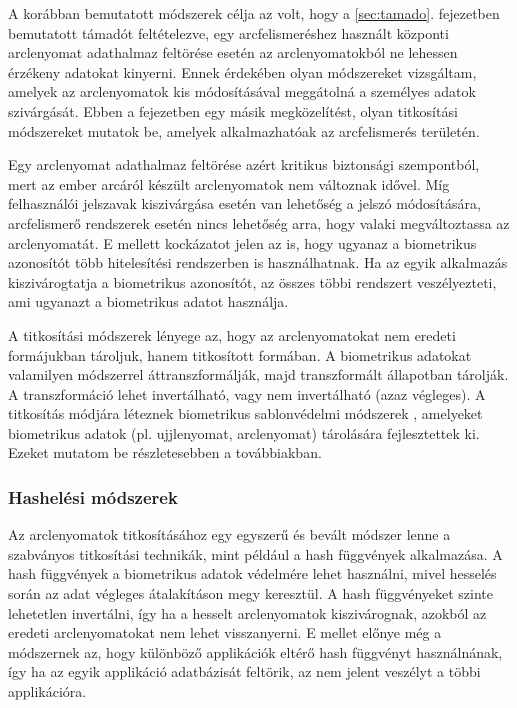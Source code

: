 A korábban bemutatott módszerek célja az volt, hogy a \ref{sec:tamado}. fejezetben bemutatott támadót feltételezve, egy arcfelismeréshez használt központi arclenyomat adathalmaz feltörése esetén az arclenyomatokból ne lehessen érzékeny adatokat kinyerni. Ennek érdekében olyan módszereket vizsgáltam, amelyek az arclenyomatok kis módosításával meggátolná a személyes adatok szivárgását. Ebben a fejezetben egy másik megközelítést, olyan titkosítási módszereket mutatok be, amelyek alkalmazhatóak az arcfelismerés területén.

Egy arclenyomat adathalmaz feltörése azért kritikus biztonsági szempontból, mert az ember arcáról készült arclenyomatok nem változnak idővel. Míg felhasználói jelszavak kiszivárgása esetén van lehetőség a jelszó módosítására, arcfelismerő rendszerek esetén nincs lehetőség arra, hogy valaki megváltoztassa az arclenyomatát. E mellett kockázatot jelen az is, hogy ugyanaz a biometrikus azonosítót több hitelesítési rendszerben is használhatnak. Ha az egyik alkalmazás kiszivárogtatja a biometrikus azonosítót, az összes többi rendszert veszélyezteti, ami ugyanazt a biometrikus adatot használja.

A titkosítási módszerek lényege az, hogy az arclenyomatokat nem eredeti formájukban tároljuk, hanem titkosított formában. A biometrikus adatokat valamilyen módszerrel áttranszformálják, majd transzformált állapotban tárolják. A transzformáció lehet invertálható, vagy nem invertálható (azaz végleges). A titkosítás módjára léteznek biometrikus sablonvédelmi módszerek \cite{patel2015cancelable}, amelyeket biometrikus adatok (pl. ujjlenyomat, arclenyomat) tárolására fejlesztettek ki. Ezeket mutatom be részletesebben a továbbiakban.



\subsubsection{Hashelési módszerek}

Az arclenyomatok titkosításához egy egyszerű és bevált módszer lenne a szabványos titkosítási technikák, mint például a hash függvények alkalmazása. A hash függvények a biometrikus adatok védelmére lehet használni, mivel hesselés során az adat végleges átalakításon megy keresztül. A hash függvényeket szinte lehetetlen invertálni, így ha a hesselt arclenyomatok kiszivárognak, azokból az eredeti arclenyomatokat nem lehet visszanyerni. E mellet előnye még a módszernek az, hogy különböző applikációk eltérő hash függvényt használnának, így ha az egyik applikáció adatbázisát feltörik, az nem jelent veszélyt a többi applikációra.

